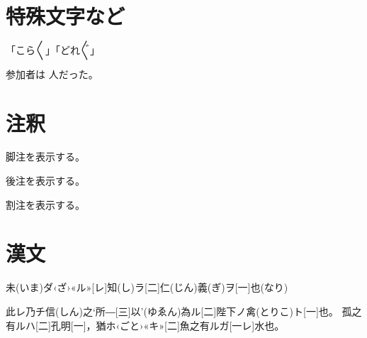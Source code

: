 \documentclass[ %
lualatex, %
tate, %
hanging_punctuation, %
paper=b6, %
reference_mark=interlinear, %
sidenote_length=10zw,       %
book %
]{jlreq}
\begin{document}
\section{特殊文字など}

     
     
     
     

     
     
     
     

     
     
     
     


「こら〳〵」「どれ〴〵」

参加者は\,\,人だった。


\section{注釈}

脚注を表示する。

後注を表示する。

割注を表示する。


\section{漢文}

\Kanbun
未(いま){ダ}‹ざ›«ル»[レ]知(し){ラ}[二]仁(じん)義(ぎ){ヲ}[一]也(なり)
\EndKanbun

\printkanbun

\Kanbun
此レ乃チ信(しん)之‘所―[三]以’(ゆゑん)為ル[二]陛下ノ禽(とりこ)ト[一]也。
\EndKanbun
\let\信\printkanbun
\Kanbun
孤之有ルハ[二]孔明[一]，猶ホ‹ごと›«キ»[二]魚之有ルガ[一レ]水也。
\EndKanbun
\let\孔明\printkanbun

\孔明\par\bfseries\信
\end{document}
